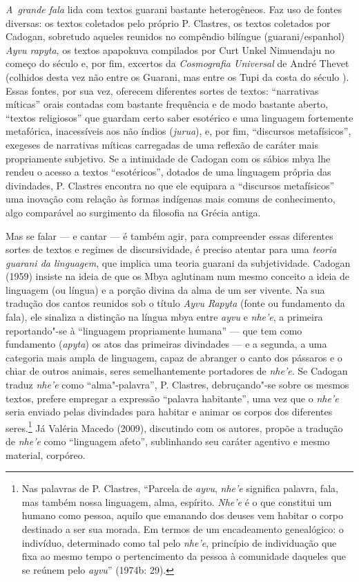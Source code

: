 \emph{A~grande fala} lida com textos guarani bastante heterogêneos. Faz uso de
fontes diversas: os textos coletados pelo próprio P. Clastres, os
textos coletados por Cadogan, sobretudo aqueles reunidos no compêndio
bilíngue (guarani/espanhol) \emph{Ayvu rapyta}, os textos apapokuva compilados
por Curt Unkel Nimuendaju no começo do século  e, por fim, excertos
da \emph{Cosmografia Universal} de André Thevet (colhidos desta vez não entre
os Guarani, mas entre os Tupi da costa do século ). Essas fontes,
por sua vez, oferecem diferentes sortes de textos: ``narrativas míticas''
orais contadas com bastante frequência e de modo bastante aberto,
``textos religiosos'' que guardam certo saber esotérico e uma linguagem
fortemente metafórica, inacessíveis aos não índios (\emph{jurua}), e, por fim,
``discursos metafísicos'', exegeses de narrativas míticas carregadas de
uma reflexão de caráter mais propriamente subjetivo. Se a intimidade de
Cadogan com os sábios mbya lhe rendeu o acesso a textos ``esotéricos'',
dotados de uma linguagem própria das divindades, P. Clastres encontra
no que ele equipara a ``discursos metafísicos'' uma inovação com relação
às formas indígenas mais comuns de conhecimento, algo comparável ao
surgimento da filosofia na Grécia antiga.

Mas se falar --- e cantar --- é também agir, para compreender essas
diferentes sortes de textos e regimes de discursividade, é preciso
atentar para uma \emph{teoria guarani da linguagem}, que implica uma teoria
guarani da subjetividade. Cadogan (1959) insiste na ideia de que os
Mbya aglutinam num mesmo conceito a ideia de linguagem (ou língua) e a
porção divina da alma de um ser vivente. Na sua tradução dos cantos
reunidos sob o título \emph{Ayvu Rapyta} (fonte ou fundamento da fala), ele
sinaliza a distinção na língua mbya entre \emph{ayvu} e \emph{nhe’e}, a primeira
reportando"-se à ``linguagem propriamente humana'' --- que tem como
fundamento (\emph{apyta}) os atos das primeiras divindades --- e a segunda, a
uma categoria mais ampla de linguagem, capaz de abranger o canto dos
pássaros e o chiar de outros animais, seres semelhantemente portadores
de \emph{nhe’e}. Se Cadogan traduz \emph{nhe’e} como ``alma"-palavra'', P. Clastres,
debruçando"-se sobre os mesmos textos, prefere empregar a expressão
``palavra habitante'', uma vez que o \emph{nhe’e} seria enviado pelas divindades
para habitar e animar os corpos dos diferentes seres.\footnote{Nas
palavras de P. Clastres, ``Parcela de \emph{ayvu}, \emph{nhe’e} significa palavra,
fala, mas também nossa linguagem, alma, espírito. \emph{Nhe’e} é o que
constitui um humano como pessoa, aquilo que emanando dos deuses vem
habitar o corpo destinado a ser sua morada. Em termos de um
encadeamento genealógico: o indivíduo, determinado como tal pelo \emph{nhe’e},
princípio de individuação que fixa ao mesmo tempo o pertencimento da
pessoa à comunidade daqueles que se reúnem pelo \emph{ayvu}'' (1974b: 29).} Já
Valéria Macedo (2009), discutindo com os autores, propõe a tradução de
\emph{nhe’e} como ``linguagem afeto'', sublinhando seu caráter agentivo e mesmo
material, corpóreo. 

